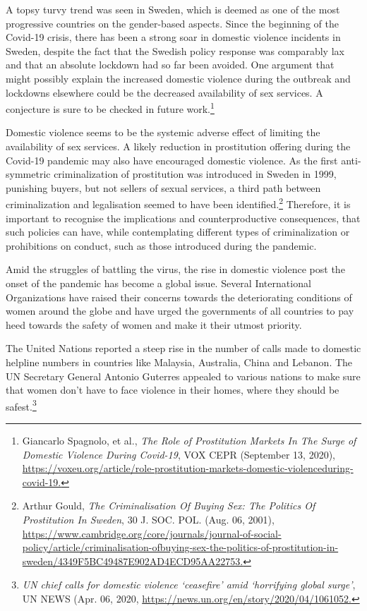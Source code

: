 \begin{multicols}{2}
\noi
A topsy turvy trend was seen in Sweden, which is deemed as one of the most progressive
countries on the gender-based aspects. Since the beginning of the Covid-19 crisis, there has
been a strong soar in domestic violence incidents in Sweden, despite the fact that the Swedish
policy response was comparably lax and that an absolute lockdown had so far been avoided.
One argument that might possibly explain the increased domestic violence during the outbreak and lockdowns elsewhere could be the decreased availability of sex services. A
conjecture is sure to be checked in future work.\footnote{Giancarlo Spagnolo, et al., \textit{The Role of Prostitution Markets In The Surge of Domestic Violence During Covid-19}, VOX CEPR (September 13, 2020), \url{https://voxeu.org/article/role-prostitution-markets-domestic-violenceduring-covid-19.}}

\noi
Domestic violence seems to be the systemic adverse effect of limiting the availability of sex
services. A likely reduction in prostitution offering during the Covid-19 pandemic may also
have encouraged domestic violence. As the first anti-symmetric criminalization of
prostitution was introduced in Sweden in 1999, punishing buyers, but not sellers of sexual
services, a third path between criminalization and legalisation seemed to have been
identified.\footnote{Arthur Gould, \textit{The Criminalisation Of Buying Sex: The Politics Of Prostitution In Sweden}, 30 J. SOC. POL.
(Aug. 06, 2001), \url{https://www.cambridge.org/core/journals/journal-of-social-policy/article/criminalisation-ofbuying-sex-the-politics-of-prostitution-in-sweden/4349F5BC49487E902AD4ECD95AA22753.}} Therefore, it is important to recognise the implications and counterproductive
consequences, that such policies can have, while contemplating different types of
criminalization or prohibitions on conduct, such as those introduced during the pandemic.


\noi
Amid the struggles of battling the virus, the rise in domestic violence post the onset of the
pandemic has become a global issue. Several International Organizations have raised their
concerns towards the deteriorating conditions of women around the globe and have urged the
governments of all countries to pay heed towards the safety of women and make it their
utmost priority.


\noi
The United Nations reported a steep rise in the number of calls made to domestic helpline
numbers in countries like Malaysia, Australia, China and Lebanon. The UN Secretary
General Antonio Guterres appealed to various nations to make sure that women don’t have to
face violence in their homes, where they should be safest.\footnote{\textit{UN chief calls for domestic violence ‘ceasefire’ amid ‘horrifying global surge’}, UN NEWS (Apr. 06, 2020,
\url{https://news.un.org/en/story/2020/04/1061052.}}


\end{multicols}
